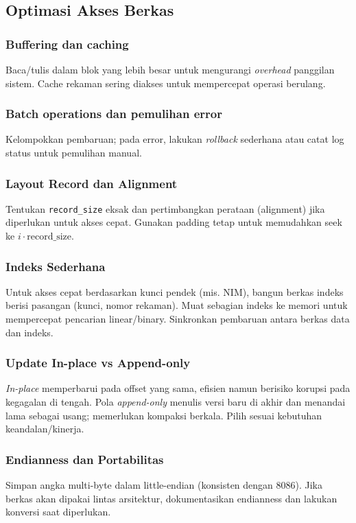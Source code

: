 \subsection{Optimasi Akses Berkas}
\subsubsection{Buffering dan caching}
Baca/tulis dalam blok yang lebih besar untuk mengurangi \textit{overhead} panggilan sistem. Cache rekaman sering diakses untuk mempercepat operasi berulang.

\subsubsection{Batch operations dan pemulihan error}
Kelompokkan pembaruan; pada error, lakukan \textit{rollback} sederhana atau catat log status untuk pemulihan manual.

\subsubsection{Layout Record dan Alignment}
Tentukan \texttt{record\_size} eksak dan pertimbangkan perataan (alignment) jika diperlukan untuk akses cepat. Gunakan padding tetap untuk memudahkan seek ke \(i\cdot \text{record\_size}\). \cite{osdev_wiki}

\subsubsection{Indeks Sederhana}
Untuk akses cepat berdasarkan kunci pendek (mis. NIM), bangun berkas indeks berisi pasangan (kunci, nomor rekaman). Muat sebagian indeks ke memori untuk mempercepat pencarian linear/binary. Sinkronkan pembaruan antara berkas data dan indeks. \cite{osdev_wiki}

\subsubsection{Update In-place vs Append-only}
\textit{In-place} memperbarui pada offset yang sama, efisien namun berisiko korupsi pada kegagalan di tengah. Pola \textit{append-only} menulis versi baru di akhir dan menandai lama sebagai usang; memerlukan kompaksi berkala. Pilih sesuai kebutuhan keandalan/kinerja. \cite{osdev_wiki}

\subsubsection{Endianness dan Portabilitas}
Simpan angka multi-byte dalam little-endian (konsisten dengan 8086). Jika berkas akan dipakai lintas arsitektur, dokumentasikan endianness dan lakukan konversi saat diperlukan. \cite{wiki_endianness}

